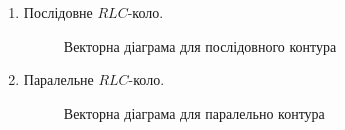 \begin{enumerate}
\clearpage

\item  Послідовне $RLC$-коло.
\begin{figure}[h!]\centering
 
\caption{Векторна діаграма для послідовного контура}
\label{pic:S-vector_diagrams}
\end{figure}

\item  Паралельне $RLC$-коло.
\begin{figure}[h!]\centering
 
\caption{Векторна діаграма для паралельно контура}
\label{pic:P-vector_diagrams}
\end{figure}
\end{enumerate}

